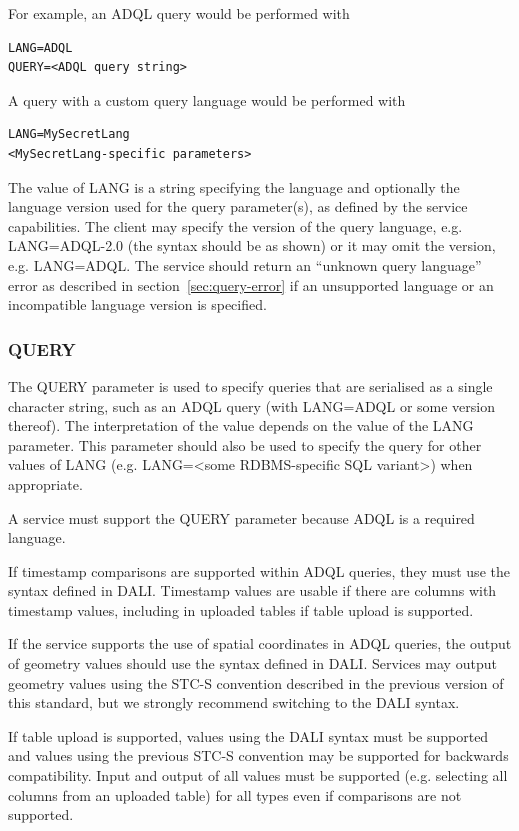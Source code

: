 \documentclass[11pt,letter]{ivoa}
\begin{document}
For example, an ADQL query would be performed with
\begin{verbatim}
LANG=ADQL
QUERY=<ADQL query string>
\end{verbatim}
A query with a custom query language would be performed with
\begin{verbatim}
LANG=MySecretLang
<MySecretLang-specific parameters>
\end{verbatim}
The value of LANG is a string specifying the language and optionally the 
language version used for the query parameter(s), as defined by the service 
capabilities.  The client may specify the version of the query language,  e.g. 
LANG=ADQL-2.0 (the syntax should be as shown) or it may omit the version, e.g. 
LANG=ADQL.  The service should return an “unknown query language” error as 
described in section~\ref{sec:query-error} if an unsupported language or an incompatible 
language version is specified.

\subsubsection{QUERY}
\label{sec:QUERY}

The QUERY parameter is used to specify queries that are serialised as a single character string, such as an ADQL query (with LANG=ADQL or some version thereof). The  interpretation
of the value depends on the value of the LANG parameter. This parameter should also be used to 
specify the query for other values of LANG (e.g. LANG=<some RDBMS-specific SQL 
variant>) when appropriate.

A service must support the QUERY parameter because ADQL is a required language.

If timestamp comparisons are supported within ADQL queries, they must use the syntax 
defined in DALI. Timestamp values are usable if there are columns with timestamp values, 
including in uploaded tables if table upload is supported.

If the service supports the use of spatial coordinates in ADQL queries, the output of 
geometry values should use the syntax defined in DALI. Services may output geometry values
using the STC-S convention described in the previous version of this standard, but we 
strongly recommend switching to the DALI syntax. 

If table upload is supported, values using the DALI syntax must be supported and values using 
the previous STC-S convention may be supported for backwards compatibility. Input and output of 
all values must be supported (e.g. selecting all columns from an uploaded table) for all types 
even if comparisons are not supported.
\end{document}
